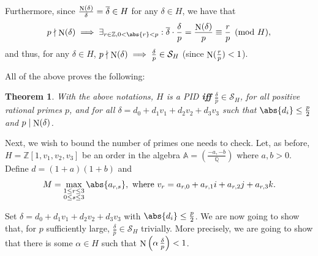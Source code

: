 \documentclass[10pt]{article}
\newtheorem{theorem}{Theorem}
\theoremstyle{definition}
\newcommand\A{\mathbb{A}}
\newcommand\QQ{\mathbb{Q}}
\newcommand\ZZ{\mathbb{Z}}
\newcommand\SC{\mathcal{S}}
\newcommand\N{\mathop{\rm N}\nolimits}
\begin{document}
Furthermore, since $\frac{\N(\delta)}\delta = \overline{ \delta}\in H$
for any $\delta\in H$, we have that
\[ p \nmid \N(\delta)\implies \exists_{r\in\ZZ, 0<\abs{r}< p}:
  \overline{\delta} \cdot \frac{\delta}{p} = \frac{\N(\delta)}{p}
  \equiv \frac{r} p \pmod{ H},\] and thus, for any $\delta \in H$,
$p \nmid\N(\delta) \implies \frac{\delta}{p} \in\SC_H$
{\footnotesize(since $\N(\frac{r}{p})<1$)}.

All of the above proves the following:

\begin{theorem}\label{Reduction_deltas}
  With the above notations, $H$ is a PID \; {\bf iff} \;
  $\frac{\delta}{p} \in \SC_H$, for all positive rational primes $p$,
  and for all $\delta = d_0 + d_1 v_1 + d_2 v_2 + d_3 v_3$ such that
  $\abs{d_i} \leq \frac{p}{2}$ and $ p\mid \N(\delta)$.
\end{theorem}    

Next, we wish to bound the number of primes one needs to check. Let,
as before, $H=\ZZ[1,v_1,v_2,v_3]$ be an order in the algebra
$\A = \left ( \frac{-a,-b}{\QQ} \right)$ where $a,b >0$.  Define
$d=(1+a)(1+b)$ and
\[M= \max_{\substack{1 \leq r \leq 3 \\ 0 \leq s \leq 3}}
  \abs{a_{r,s}}, \text{ where } v_r= a_{r,0} + a_{r,1} i + a_{r,2} j +
  a_{r,3} k.\]

Set $\delta = d_0 + d_1 v_1 + d_2 v_2 + d_3 v_3$ with
$\abs{d_i} \leq \frac{p}{2}$. We are now going to show that, for $p$
sufficiently large, $\frac{\delta}{p} \in \SC_H$ trivially. More
precisely, we are going to show that there is some $\alpha \in H$ such
that $\N \left(\alpha\, \frac{\delta}{p} \right)<1$.
\end{document}
